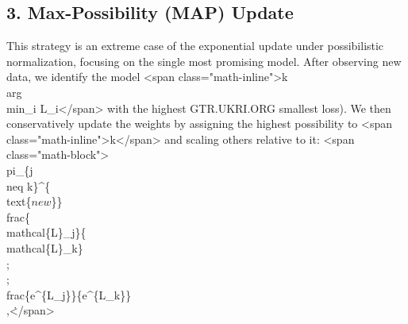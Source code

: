 \documentclass{article}
\begin{document}
\subsection*{3. Max-Possibility (MAP) Update}
This strategy is an extreme case of the exponential update under possibilistic normalization, focusing on the single most promising model. After observing new data, we identify the model <span class="math-inline">k \= \\arg\\min\_i L\_i</span> with the highest
GTR.UKRI.ORG
smallest loss). We then conservatively update the weights by assigning the highest possibility to <span class="math-inline">k</span> and scaling others relative to it:
<span class="math-block">\\pi\_\{j\\neq k\}^\{\\text\{\(new\)\}\} \= \\frac\{\\mathcal\{L\}\_j\}\{\\mathcal\{L\}\_k\} \\;\=\\; \\frac\{e^\{\-L\_j\}\}\{e^\{\-L\_k\}\}\\,\.</span>
\end{document}
